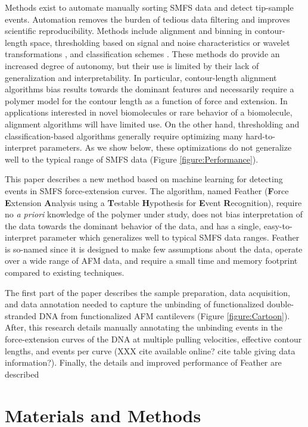 \documentclass[%
  aip,12pt,tightenlines,
  amsthm,
 amsmath,amssymb
]{article}
\newcommand{\fRef}[1]{Figure \ref{figure:#1}}
\newcommand{\sLabel}[1]{\label{section:#1}}
\newcommand{\pl}[0]{\vspace{6pt}}
\newcommand{\name}[0]{Feather}
\newcommand{\acronym}[0]{\textbf{F}orce \textbf{E}xtension \textbf{A}nalysis using a \textbf{T}estable \textbf{H}ypothesis for \textbf{E}vent \textbf{R}ecognition}
\newcommand{\singlemol}[0]{SMFS}
\begin{document}
Methods exist to automate manually sorting \singlemol{} data and detect tip-sample events. Automation removes the burden of tedious data filtering and improves scientific reproducibility. Methods include alignment and binning in contour-length space\cite{kuhn_automated_2005,bosshart_reference-free_2012}, thresholding based on signal and noise characteristics \cite{gergely_semi-automatized_2001,roduit_openfovea:_2012} or wavelet transformations \cite{garcia-masso_automated_2016,benitez_searching_2017}, and classification schemes \cite{kasas_fuzzy_2000}. These methods do provide an increased degree of autonomy, but their use is limited by their lack of generalization and interpretability. In particular, contour-length alignment algorithms bias results towards the dominant features and necessarily require a polymer model for the contour length as a function of force and extension. In applications interested in novel biomolecules or rare behavior of a biomolecule, alignment algorithms will have limited use.  On the other hand, thresholding and classification-based algorithms generally require optimizing many hard-to-interpret parameters. As we show below, these optimizations do not generalize well to the typical range of \singlemol{} data (\fRef{Performance}).\pl

This paper describes a new method based on machine learning for detecting events in \singlemol{} force-extension curves.  The algorithm, named \name{} (\acronym{}), require no \emph{a priori} knowledge of the polymer under study, does not bias interpretation of the data towards the dominant behavior of the data, and has a single, easy-to-interpret parameter which generalizes well to typical \singlemol{} data ranges. \name{} is so-named since it is designed to make few assumptions about the data, operate over a wide range of AFM data, and require a small time and memory footprint compared to existing techniques.\pl

 The first part of the paper describes the sample preparation, data acquisition, and data annotation needed to capture the unbinding of functionalized double-stranded DNA from functionalized AFM cantilevers (\fRef{Cartoon}). After, this research details manually annotating the unbinding events in the force-extension curves of the DNA at multiple pulling velocities, effective contour lengths, and events per curve (XXX cite available online? cite table giving data information?). Finally, the details and improved performance of \name{} are described \pl

\section{\sLabel{Materials}Materials and Methods}
\end{document}
